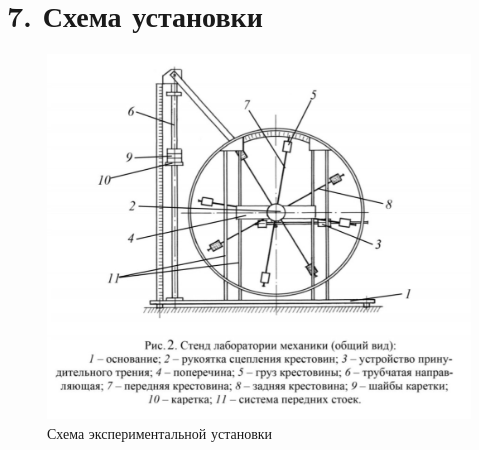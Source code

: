 \documentclass[14pt]{extreport}
\begin{document}
\section*{7. Схема установки}
\begin{figure}[H]
	\begin{center}
		\includegraphics[scale=0.5]{scheme.png}
		\caption{Схема экспериментальной установки}
		\label{pic}
	\end{center}
\end{figure}

\newpage
\end{document}
